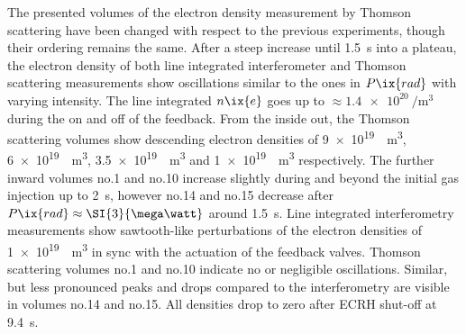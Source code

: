             The presented volumes of the electron density measurement by Thomson scattering have been changed with respect to the previous experiments, though their ordering remains the same. After a steep increase until \SI{1.5}{\second} into a plateau, the electron density of both line integrated interferometer and Thomson scattering measurements show oscillations similar to the ones in $P\ix{rad}$ with varying intensity. The line integrated $n\ix{e}$ goes up to $\approx\SI[per-mode=reciprocal]{1.4e20}{\per\cubic\meter}$ during the on and off of the feedback. From the inside out, the Thomson scattering volumes show descending electron densities of \SI[per-mode=reciprocal]{9e19}{\per\cubic\meter}, \SI[per-mode=reciprocal]{6e19}{\per\cubic\meter}, \SI[per-mode=reciprocal]{3.5e19}{\per\cubic\meter} and \SI[per-mode=reciprocal]{1e19}{\per\cubic\meter} respectively. The further inward volumes no.1 and no.10 increase slightly during and beyond the initial gas injection up to \SI{2}{\second}, however no.14 and no.15 decrease after $P\ix{rad}\approx\SI{3}{\mega\watt}$ around \SI{1.5}{\second}. Line integrated interferometry measurements show sawtooth-like perturbations of the electron densities of \SI[per-mode=reciprocal]{1e19}{\per\cubic\meter} in sync with the actuation of the feedback valves. Thomson scattering volumes no.1 and no.10 indicate no or negligible oscillations. Similar, but less pronounced peaks and drops compared to the interferometry are visible in volumes no.14 and no.15. All densities drop to zero after ECRH shut-off at \SI{9.4}{\second}.\\%
